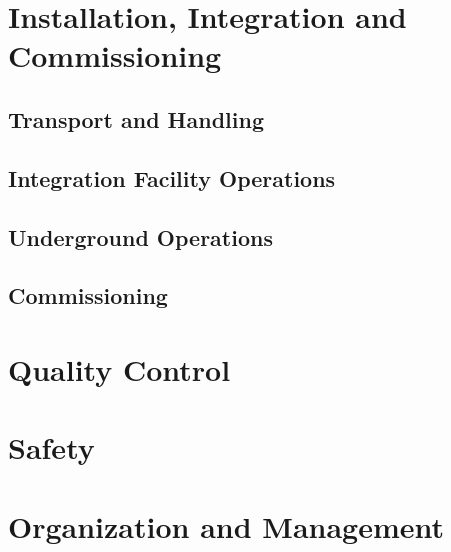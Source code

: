 \section{Installation, Integration and Commissioning}
\label{sec:fdsp-slow-cryo-install}

\subsection{Transport and Handling}
\label{sec:fdsp-slow-cryo-install-transport}


\subsection{Integration Facility Operations}
\label{sec:fdsp-slow-cryo-install-facil-ops}


\subsection{Underground Operations}
\label{sec:fdsp-slow-cryo-install-undergr}

\subsection{Commissioning}
\label{sec:fdsp-slow-cryo-install-commiss}



\section{Quality Control}
\label{sec:fdsp-slow-cryo-qc}




\section{Safety}
\label{sec:fdsp-slow-cryo-safety}



\section{Organization and Management}
\label{sec:fdsp-slow-cryo-org}


